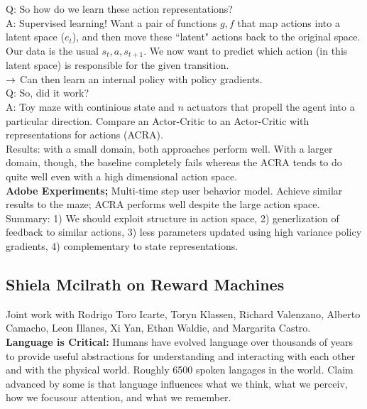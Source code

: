 Q: So how do we learn these action representations? \\

A: Supervised learning! Want a pair of functions $g,f$ that map actions into a latent space ($e_t$), and then move these ``latent" actions back to the original space. Our data is the usual $s_t, a, s_{t+1}$. We now want to predict which action (in this latent space) is responsible for the given transition. \\

$\rightarrow$ Can then learn an internal policy with policy gradients. \\

Q: So, did it work? \\

A: Toy maze with continious state and $n$ actuators that propell the agent into a particular direction. Compare an Actor-Critic to an Actor-Critic with representations for actions (ACRA). \\

Results: with a small domain, both approaches perform well. With a larger domain, though, the baseline completely fails whereas the ACRA tends to do quite well even with a high dimensional action space. \\

{\bf Adobe Experiments;} Multi-time step user behavior model. Achieve similar results to the maze; ACRA performs well despite the large action space. \\

Summary: 1) We should exploit structure in action space, 2) generlization of feedback to similar actions, 3) less parameters updated using high variance policy gradients, 4) complementary to state representations. \\

\spacerule

\subsection{Shiela Mcilrath on Reward Machines}

Joint work with Rodrigo Toro Icarte, Toryn Klassen, Richard Valenzano, Alberto Camacho, Leon Illanes, Xi Yan, Ethan Waldie, and Margarita Castro. \\

{\bf Language is Critical:} Humans have evolved language over thousands of years to provide useful abstractions for understanding and interacting with each other and with the physical world. Roughly 6500 spoken langages in the world. Claim advanced by some is that language influences what we think, what we perceiv, how we focusour attention, and what we remember. \\

